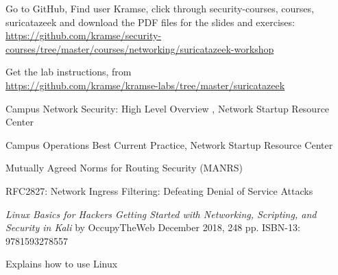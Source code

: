 \documentclass[Screen16to9,17pt]{foils}
\begin{document}

 \begin{list2}
 \item Go to GitHub, Find user Kramse, click through security-courses, courses, suricatazeek and download the PDF files for the slides and exercises:\\  {\footnotesize \url{https://github.com/kramse/security-courses/tree/master/courses/networking/suricatazeek-workshop}}

 \item Get the lab instructions, from\\ {\footnotesize\url{https://github.com/kramse/kramse-labs/tree/master/suricatazeek}}
 \end{list2}


\myquestionspage


\begin{list2}
\item Campus Network Security: High Level Overview , Network Startup Resource Center

\item Campus Operations Best Current Practice, Network Startup Resource Center

\item Mutually Agreed Norms for Routing Security (MANRS)

\item RFC2827: Network Ingress Filtering: Defeating Denial of Service Attacks
\end{list2}



\emph{Linux Basics for Hackers
Getting Started with Networking, Scripting, and Security in Kali}
by OccupyTheWeb
December 2018, 248 pp.
ISBN-13:
9781593278557

Explains how to use Linux

\end{document}
